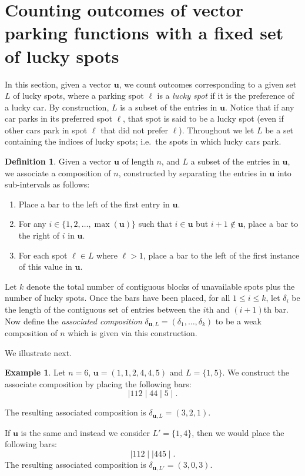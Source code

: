 \documentclass[reqno]{amsart}
\theoremstyle{definition}
\newtheorem{example}[theorem]{Example}
\newtheorem{definition}[theorem]{Definition}
\theoremstyle{remark}
\newcommand{\bsy}{\boldsymbol}
\begin{document}
\section{Counting outcomes of vector parking functions with a fixed set of lucky spots}\label{sec:outcomesbyspots}

In this section, given a vector $\bsy u$, we count outcomes corresponding to a given set $L$ of lucky spots, where a parking spot $\ell$ is a \emph{lucky spot} if it is the preference of a lucky car.
By construction, $L$ is a subset of the entries in $\bsy u$. 
Notice that if any car parks in its preferred spot $\ell$, that spot is said to be a lucky spot (even if other cars park in spot $\ell$ that did not prefer $\ell$).
Throughout we let $L$ be a set containing the indices of lucky spots; i.e.\ the spots in which lucky cars park. 




\begin{definition}\label{def:delta}
Given a vector $\bsy u$ of length $n$, and $L$ a subset of the entries in $\bsy u$, we associate a composition of $n$, constructed by separating the entries in $\bsy u$ into sub-intervals as follows:
    \begin{enumerate}
    \item Place a bar to the left of the first entry in $\bsy u$. 
    \item For any $i \in \{1,2,\ldots, \max(\bsy u)\}$ such that $i \in \bsy u$ but $i+1 \notin \bsy u$, place a bar to the right of $i$ in $\bsy u$.
    \item For each spot $\ell\in L$ where {$\ell>1$}, place a bar to the left of the first instance of this value in $\bsy u$.
\end{enumerate}
Let $k$ denote the total number of contiguous blocks of unavailable spots plus the number of lucky spots. 
Once the bars have been placed,
for all $1\leq i\leq k$, let $\delta_i$ be the length of the contiguous set of entries between the $i$th and $(i+1)$th bar. 
Now define the \emph{associated composition} $\delta_{\bsy u, L} =  (\delta_1,\ldots, \delta_k)$ to be a weak composition of $n$ which is given via this construction. 

\end{definition}
We illustrate  next.

\begin{example}
Let $n=6$, $\bsy u=(1,1,2,4,4,5)$ and $L=\{1,5\}$. We construct the associate composition by placing the following bars:
 \[ \mid 112 \mid 44  \mid 5 \mid.\]
 
\noindent The resulting associated composition is $\delta_{\bsy u, L}=(3,2,1)$.

If $\bsy u$ is the same and instead we consider $L'=\{1,4\}$, then we would place the following bars:
\[\mid 112 \mid \mid 44  5 \mid.\]
The resulting associated composition is $\delta_{\bsy u, L'}=(3,0,3)$.
\end{example}
\end{document}
